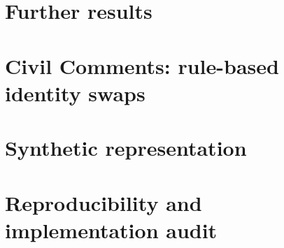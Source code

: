 \documentclass[11pt]{article}
\begin{document}
\section{Further results}
\label{app:more}


\section{Civil Comments: rule-based identity swaps}
\label{app:civil}


\section{Synthetic representation}
\label{app:synthetic}


\section{Reproducibility and implementation audit}
\label{app:repro}

\end{document}
